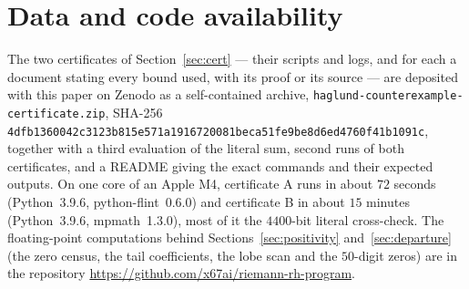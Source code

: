 \documentclass[11pt]{article}
\theoremstyle{plain}
\theoremstyle{definition}
\theoremstyle{remark}
\begin{document}
\section*{Data and code availability}

The two certificates of Section~\ref{sec:cert} --- their scripts and logs, and
for each a document stating every bound used, with its proof or its source ---
are deposited with this paper on Zenodo as a self-contained archive,
\texttt{haglund-counterexample-certificate.zip}, SHA-256
\texttt{4dfb1360042c3123b815e571a1916720}\allowbreak\texttt{081beca51fe9be8d6ed4760f41b1091c}, together with a third evaluation
of the literal sum, second runs of both certificates, and a README giving the
exact commands and their expected outputs. On one core of an Apple M4,
certificate A runs in about $72$ seconds (Python~3.9.6, python-flint~0.6.0) and
certificate B in about $15$ minutes (Python~3.9.6, mpmath~1.3.0), most of it
the $4400$-bit literal cross-check. The floating-point computations behind
Sections~\ref{sec:positivity} and~\ref{sec:departure} (the zero census, the tail
coefficients, the lobe scan and the $50$-digit zeros) are in the repository
\url{https://github.com/x67ai/riemann-rh-program}.
\end{document}
